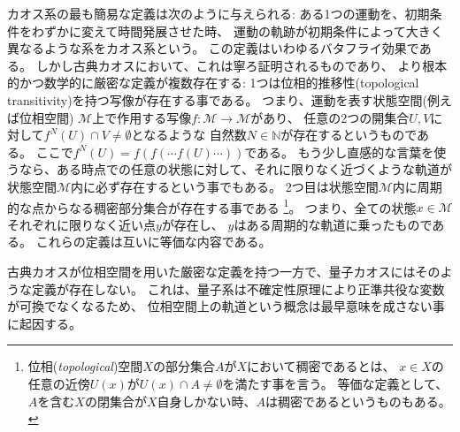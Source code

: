 カオス系の最も簡易な定義は次のように与えられる:
ある1つの運動を、初期条件をわずかに変えて時間発展させた時、
運動の軌跡が初期条件によって大きく異なるような系をカオス系という。
この定義はいわゆるバタフライ効果である。
しかし古典カオスにおいて、これは寧ろ証明されるものであり、
より根本的かつ数学的に厳密な定義が複数存在する\cite{hsiao}:
1つは位相的推移性(topological transitivity)を持つ写像が存在する事である。
つまり、運動を表す状態空間(例えば位相空間)
$\mathcal{M}$上で作用する写像$f: \mathcal{M}\to\mathcal{M}$があり、
任意の2つの開集合$U, V$に対して$f^N(U)\cap V \neq \emptyset$となるような
自然数$N\in\mathbb{N}$が存在するというものである。
ここで$f^N(U) = f(f(\cdots f(U) \cdots ))$である。
もう少し直感的な言葉を使うなら、ある時点での任意の状態に対して、それに限りなく近づくような軌道が
状態空間$\mathcal{M}$内に必ず存在するという事でもある。
2つ目は状態空間$\mathcal{M}$内に周期的な点からなる稠密部分集合が存在する事である
\footnote{位相(\textit{topological})空間$X$の部分集合$A$が$X$において稠密であるとは、
	$x\in X$の任意の近傍$U(x)$が$U(x)\cap A \neq \emptyset$を満たす事を言う。
	等価な定義として、$A$を含む$X$の閉集合が$X$自身しかない時、$A$は稠密であるというものもある。}。
つまり、全ての状態$x\in\mathcal{M}$それぞれに限りなく近い点$y$が存在し、
$y$はある周期的な軌道に乗ったものである。
これらの定義は互いに等価な内容である。

古典カオスが位相空間を用いた厳密な定義を持つ一方で、量子カオスにはそのような定義が存在しない。
これは、量子系は不確定性原理により正準共役な変数が可換でなくなるため、
位相空間上の軌道という概念は最早意味を成さない事に起因する。

